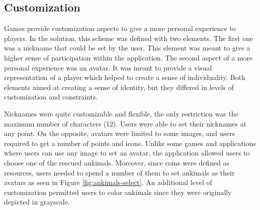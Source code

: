 \subsection{Customization}
Games provide customization aspects to give a more personal experience to players. In the solution, this scheme was defined with two elements. The first one was a nickname that could be set by the user. This element was meant to give a higher sense of participation within the application. The second aspect of a more personal experience was an avatar. It was meant to provide a visual representation of a player which helped to create a sense of individuality. Both elements aimed at creating a sense of identity, but they differed in levels of customization and constraints.

Nicknames were quite customizable and flexible, the only restriction was the maximum number of characters (12). Users were able to set their nicknames at any point. On the opposite, avatars were limited to some images, and users required to get a number of points and icons. Unlike some games and applications where users can use any image to set an avatar, the application allowed users to choose one of the rescued ankimals. Moreover, since coins were defined as resources, users needed to spend a number of them to set ankimals as their avatars as seen in Figure \ref{fig:ankimals-select}. An additional level of customization permitted users to color ankimals since they were originally depicted in grayscale.

